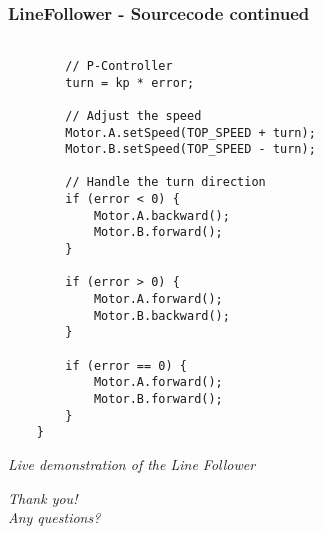 \documentclass{beamer}
\begin{document}
\begin{frame}[fragile]
\frametitle{LineFollower - Sourcecode continued}
\begin{lstlisting}[firstnumber = 83]

		// P-Controller
		turn = kp * error;

		// Adjust the speed
		Motor.A.setSpeed(TOP_SPEED + turn);
		Motor.B.setSpeed(TOP_SPEED - turn);

		// Handle the turn direction
		if (error < 0) {
			Motor.A.backward();
			Motor.B.forward();
		}

		if (error > 0) {
			Motor.A.forward();
			Motor.B.backward();
		}

		if (error == 0) {
			Motor.A.forward();
			Motor.B.forward();
		}
	}

\end{lstlisting}
\end{frame}

\begin{frame}{}
  \centering \Large
  \emph{\vspace{1em}Live demonstration of the Line Follower}
\end{frame}


\begin{frame}{}
  \centering \Large
  \emph{\vspace{1em}Thank you!\\Any questions?}
\end{frame}
 
\end{document}

